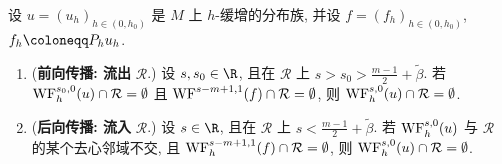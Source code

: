 \begin{theorem}\label{thm:10.16}
设 $u = (u_h)_{h \in (0, h_0)}$ 是 $M$ 上 $h$-缓增的分布族, 并设 $f = (f_h)_{h \in (0, h_0)}$, $f_h \defeq P_h u_h$.
\begin{enumerate}
    \item (\textbf{前向传播: 流出} $\mathcal{R}$.) 设 $s, s_0 \in \R$, 且在 $\mathcal{R}$ 上 $s > s_0 > \frac{m-1}{2} + \tilde{\beta}$. 若 $\operatorname{WF}_h^{s_0,0}(u) \cap \mathcal{R} = \emptyset$ 且 $\operatorname{WF}^{s-m+1,1}(f) \cap \mathcal{R} = \emptyset$, 则 $\operatorname{WF}_h^{s,0}(u) \cap \mathcal{R} = \emptyset$.
    \item (\textbf{后向传播: 流入} $\mathcal{R}$.) 设 $s \in \R$, 且在 $\mathcal{R}$ 上 $s < \frac{m-1}{2} + \tilde{\beta}$. 若 $\operatorname{WF}_h^{s,0}(u)$ 与 $\mathcal{R}$ 的某个去心邻域不交, 且 $\operatorname{WF}_h^{s-m+1,1}(f) \cap \mathcal{R} = \emptyset$, 则 $\operatorname{WF}_h^{s,0}(u) \cap \mathcal{R} = \emptyset$.
\end{enumerate}
\end{theorem}

